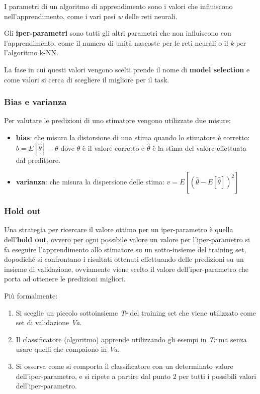 I parametri di un algoritmo di apprendimento sono i valori che influiscono nell'apprendimento, come i
vari pesi \emph{w} delle reti neurali. 

Gli \textbf{iper-parametri} sono tutti gli
altri parametri che non influiscono con l'apprendimento, come il numero
di unità nascoste per le reti neurali o il \emph{k} per l'algoritmo
k-NN.

La fase in cui questi valori vengono scelti prende il nome di
\textbf{model selection} e come valori si cerca di scegliere il migliore
per il task.

\subsubsection{Bias e varianza}\label{bias-e-varianza}

Per valutare le predizioni di uno stimatore vengono utilizzate due
misure:

\begin{itemize}
\item \textbf{bias}: che misura la distorsione di una stima quando lo stimatore è corretto: $b = E[\hat{\theta}] - \theta$ dove $\theta$ è il valore corretto e $\hat{\theta}$ è la stima del valore effettuata dal predittore.

\item \textbf{varianza}: che misura la dispersione delle stima: $v = E[(\hat{\theta} - E[\hat{\theta}])^2 ]$
\end{itemize}


\subsubsection{Hold out}\label{hold-out}

Una strategia per ricercare il valore ottimo per un iper-parametro è
quella dell'\textbf{hold out}, ovvero per ogni possibile valore un
valore per l'iper-parametro si fa eseguire l'apprendimento allo
stimatore su un sotto-insieme del training set, dopodiché si confrontano
i risultati ottenuti effettuando delle predizioni su un insieme di
validazione, ovviamente viene scelto il valore dell'iper-parametro che
porta ad ottenere le predizioni migliori.

Più formalmente:

\begin{enumerate}
\def\labelenumi{\arabic{enumi}.}
\tightlist
\item
  Si sceglie un piccolo sottoinsieme \emph{Tr} del training set che
  viene utilizzato come set di validazione \emph{Va}.
\item
  Il classificatore (algoritmo) apprende utilizzando gli esempi in
  \emph{Tr} ma senza usare quelli che compaiono in \emph{Va}.
\item
  Si osserva come si comporta il classificatore con un determinato
  valore dell'iper-parametro, e si ripete a partire dal punto 2 per
  tutti i possibili valori dell'iper-parametro.
\end{enumerate}

